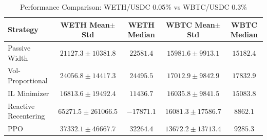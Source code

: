 \begin{table}[h]
\centering
\caption{Performance Comparison: WETH/USDC 0.05\% vs WBTC/USDC 0.3\%}
\label{tab:pool_comparison}
\begin{tabular}{lcccc}
\toprule
Strategy & WETH Mean$\pm$Std & WETH Median & WBTC Mean$\pm$Std & WBTC Median \\
\midrule
Passive Width & $21127.3 \pm 10381.8$ & $22581.4$ & $15981.6 \pm 9913.1$ & $15182.4$ \\
Vol-Proportional & $24056.8 \pm 14417.3$ & $24495.5$ & $17012.9 \pm 9842.9$ & $17832.9$ \\
IL Minimizer & $16813.6 \pm 19492.4$ & $11436.7$ & $16035.8 \pm 9841.5$ & $15083.8$ \\
Reactive Recentering & $65271.5 \pm 261066.5$ & $-17871.1$ & $16081.3 \pm 17586.7$ & $8862.1$ \\
PPO & $37332.1 \pm 46667.7$ & $32264.4$ & $13672.2 \pm 13713.4$ & $9285.3$ \\
\bottomrule
\end{tabular}
\end{table}